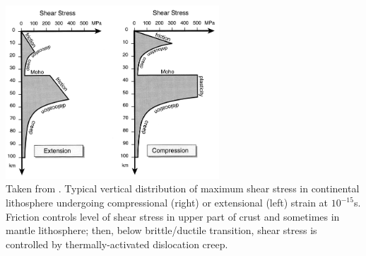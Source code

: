 \begin{center}
\includegraphics[width=8cm]{images/rheology/bird99}\\
{\scriptsize Taken from \cite{bird99}.
Typical vertical distribution of maximum shear stress in continental lithosphere 
undergoing compressional (right) or extensional (left) strain at $10^{-15}$s. 
Friction controls level of shear stress in upper part of crust and sometimes in mantle lithosphere;
then, below brittle/ductile transition, shear stress is controlled by thermally-activated dislocation creep.}
\end{center}

\Literature \cite{buwa06,budr08,rana97a,rana97b}

